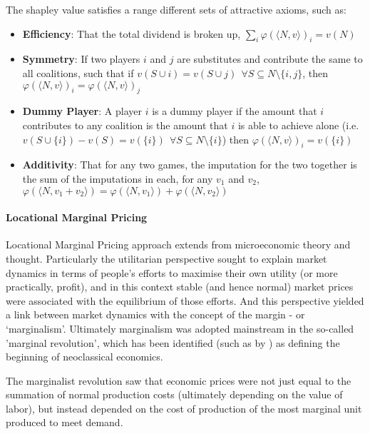 \documentclass[
10pt, %
a4paper, %
oneside, %
headinclude,footinclude, %
BCOR5mm, %
]{scrartcl}
\begin{document}
The shapley value satisfies a range different sets of attractive axioms, such as:
\begin{itemize}
\item	\textbf{Efficiency}: That the total dividend is broken up, $\sum_i\varphi(\langle N,v\rangle)_i = v(N)$
\item	\textbf{Symmetry}: If two players $i$ and $j$ are substitutes and contribute the same to all coalitions, such that if $v(S\cup i)=v(S\cup j)~~\forall S\subseteq N\setminus\{i,j\}$, then $\varphi(\langle N,v\rangle)_i = \varphi(\langle N,v\rangle)_j$
\item	\textbf{Dummy Player}: A player $i$ is a dummy player if the amount that $i$ contributes to any coalition is the amount that $i$ is able to achieve alone (i.e.\ $v(S\cup \{i\})-v(S)=v(\{i\})~~\forall S\subseteq N\setminus\{i\}$) then $\varphi(\langle N,v\rangle)_i=v(\{i\})$
\item	\textbf{Additivity}: That for any two games, the imputation for the two together is the sum of the imputations in each, for any $v_1$ and $v_2$, $\varphi(\langle N,v_1+v_2\rangle)=\varphi(\langle N,v_1 \rangle) + \varphi(\langle N,v_2\rangle)$
\end{itemize}

\paragraph{Locational Marginal Pricing}

Locational Marginal Pricing approach extends from microeconomic theory and thought.
Particularly the utilitarian perspective sought to explain market dynamics in terms of people's efforts to maximise their own utility (or more practically, profit), and in this context stable (and hence normal) market prices were associated with the equilibrium of those efforts.
And this perspective yielded a link between market dynamics with the concept of the margin - or `marginalism'.
Ultimately marginalism was adopted mainstream in the so-called 'marginal revolution', which has been identified (such as by \cite{marginalism1}) as defining the beginning of neoclassical economics.

The marginalist revolution saw that economic prices were not just equal to the summation of normal production costs (ultimately depending on the value of labor), but instead depended on the cost of production of the most marginal unit produced to meet demand.
\end{document}
